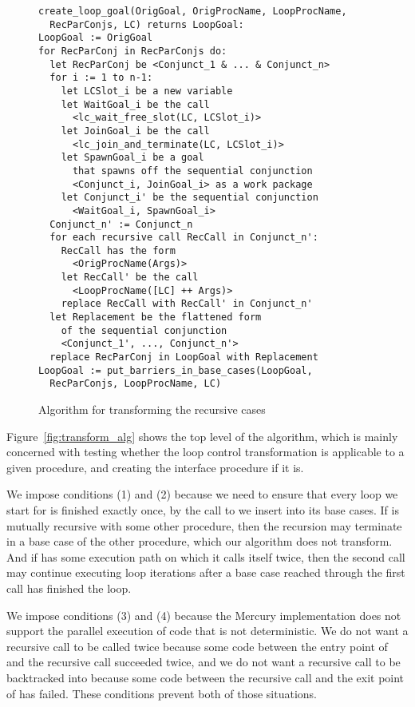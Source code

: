 \begin{figure}[tb]
\begin{center}
{\small
\begin{verbatim}
create_loop_goal(OrigGoal, OrigProcName, LoopProcName,
  RecParConjs, LC) returns LoopGoal:
LoopGoal := OrigGoal
for RecParConj in RecParConjs do:
  let RecParConj be <Conjunct_1 & ... & Conjunct_n>
  for i := 1 to n-1:
    let LCSlot_i be a new variable
    let WaitGoal_i be the call
      <lc_wait_free_slot(LC, LCSlot_i)>
    let JoinGoal_i be the call
      <lc_join_and_terminate(LC, LCSlot_i)>
    let SpawnGoal_i be a goal
      that spawns off the sequential conjunction
      <Conjunct_i, JoinGoal_i> as a work package
    let Conjunct_i' be the sequential conjunction
      <WaitGoal_i, SpawnGoal_i>
  Conjunct_n' := Conjunct_n
  for each recursive call RecCall in Conjunct_n':
    RecCall has the form
      <OrigProcName(Args)>
    let RecCall' be the call
      <LoopProcName([LC] ++ Args)>
    replace RecCall with RecCall' in Conjunct_n'
  let Replacement be the flattened form
    of the sequential conjunction
    <Conjunct_1', ..., Conjunct_n'>
  replace RecParConj in LoopGoal with Replacement
LoopGoal := put_barriers_in_base_cases(LoopGoal,
  RecParConjs, LoopProcName, LC)
\end{verbatim}
}
\end{center}
\caption{Algorithm for transforming the recursive cases}
\label{fig:reccases_alg}
\end{figure}

Figure~\ref{fig:transform_alg} shows the top level of the algorithm,
which is mainly concerned with testing
whether the loop control transformation is applicable to a given procedure,
and creating the interface procedure if it is.

We impose conditions (1) and (2) because we need to ensure
that every loop we start for  is finished exactly once,
by the call to  we insert into its base cases.
If  is mutually recursive with some other procedure,
then the recursion may terminate in a base case of the other procedure,
which our algorithm does not transform.
And if  has some execution path on which it calls itself twice,
then the second call may continue executing loop iterations
after a base case reached through the first call has finished the loop.

We impose conditions (3) and (4) because the Mercury implementation
does not support the parallel execution of code that is not deterministic.
We do not want a recursive call to be called twice because
some code between the entry point of  and the recursive call
succeeded twice,
and we do not want a recursive call to be backtracked into because
some code between the recursive call and the exit point of 
has failed.
These conditions prevent both of those situations.

